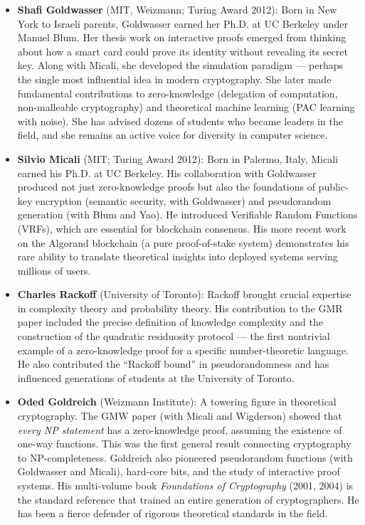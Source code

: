 \begin{itemize}
\item \textbf{Shafi Goldwasser} (MIT, Weizmann; Turing Award 2012): Born in New York to Israeli parents, Goldwasser earned her Ph.D. at UC Berkeley under Manuel Blum. Her thesis work on interactive proofs emerged from thinking about how a smart card could prove its identity without revealing its secret key. Along with Micali, she developed the simulation paradigm --- perhaps the single most influential idea in modern cryptography. She later made fundamental contributions to zero-knowledge (delegation of computation, non-malleable cryptography) and theoretical machine learning (PAC learning with noise). She has advised dozens of students who became leaders in the field, and she remains an active voice for diversity in computer science.

\item \textbf{Silvio Micali} (MIT; Turing Award 2012): Born in Palermo, Italy, Micali earned his Ph.D. at UC Berkeley. His collaboration with Goldwasser produced not just zero-knowledge proofs but also the foundations of public-key encryption (semantic security, with Goldwasser) and pseudorandom generation (with Blum and Yao). He introduced Verifiable Random Functions (VRFs), which are essential for blockchain consensus. His more recent work on the Algorand blockchain (a pure proof-of-stake system) demonstrates his rare ability to translate theoretical insights into deployed systems serving millions of users.

\item \textbf{Charles Rackoff} (University of Toronto): Rackoff brought crucial expertise in complexity theory and probability theory. His contribution to the GMR paper included the precise definition of knowledge complexity and the construction of the quadratic residuosity protocol --- the first nontrivial example of a zero-knowledge proof for a specific number-theoretic language. He also contributed the ``Rackoff bound'' in pseudorandomness and has influenced generations of students at the University of Toronto.

\item \textbf{Oded Goldreich} (Weizmann Institute): A towering figure in theoretical cryptography. The GMW paper (with Micali and Wigderson) showed that \emph{every NP statement} has a zero-knowledge proof, assuming the existence of one-way functions. This was the first general result connecting cryptography to NP-completeness. Goldreich also pioneered pseudorandom functions (with Goldwasser and Micali), hard-core bits, and the study of interactive proof systems. His multi-volume book \emph{Foundations of Cryptography} (2001, 2004) is the standard reference that trained an entire generation of cryptographers. He has been a fierce defender of rigorous theoretical standards in the field.


\end{itemize}
